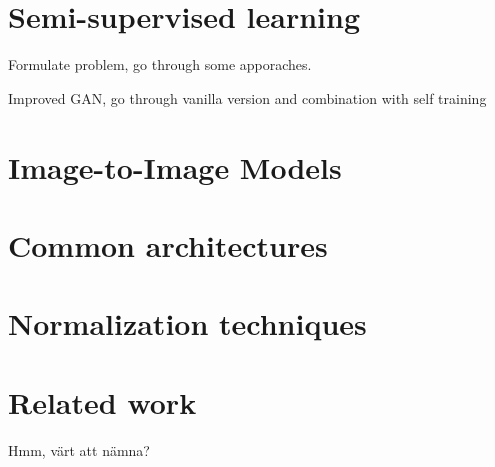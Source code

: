 \section{Semi-supervised learning}
Formulate problem, go through some apporaches.

Improved GAN, go through vanilla version and combination with self training \cite{wuliu2017selftrainsemisup}

\section{Image-to-Image Models}

\section{Common architectures}

\section{Normalization techniques}

\section{Related work}
Hmm, värt att nämna? 






